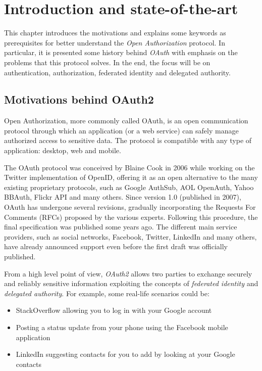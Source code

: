\chapter{Introduction and state-of-the-art}
This chapter introduces the motivations and explains some keywords as prerequisites for better understand the \textit{Open Authorization} protocol. In particular, it is presented some history behind \textit{OAuth} with emphasis on the problems that this protocol solves. In the end, the focus will be on authentication, authorization, federated identity and delegated authority.
\minitoc

\section{Motivations behind OAuth2}
Open Authorization, more commonly called OAuth, is an open communication protocol through which an application (or a web service) can safely manage authorized access to sensitive data. The protocol is compatible with any type of application: desktop, web and mobile.

The OAuth protocol was conceived by Blaine Cook in 2006 while working on the Twitter implementation of OpenID, offering it as an open alternative to the many existing proprietary protocols, such as Google AuthSub, AOL OpenAuth, Yahoo BBAuth, Flickr API and many others. Since version 1.0 (published in 2007), OAuth has undergone several revisions, gradually incorporating the Requests For Comments (RFCs) proposed by the various experts. Following this procedure, the final specification was published some years ago. The different main service providers, such as social networks, Facebook, Twitter, LinkedIn and many others, have already announced support even before the first draft was officially published.

From a high level point of view, \textit{OAuth2} allows two parties to exchange securely and reliably sensitive information exploiting the concepts of \textit{federated identity} and \textit{delegated authority}. For example, some real-life scenarios could be:

\begin{itemize}
    \item StackOverflow allowing you to log in with your Google account
    \item Posting a status update from your phone using the Facebook mobile application
    \item LinkedIn suggesting contacts for you to add by looking at your Google contacts
\end{itemize}


